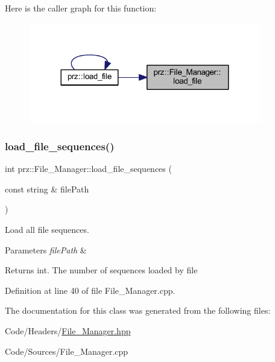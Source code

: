 Here is the caller graph for this function\+:
\nopagebreak
\begin{figure}[H]
\begin{center}
\leavevmode
\includegraphics[width=288pt]{classprz_1_1_file___manager_aad862a71b68f6bb1870b1750f33e70f4_icgraph}
\end{center}
\end{figure}
\mbox{\label{classprz_1_1_file___manager_a930093b7f609e4f9cf755efb0d91ef46}} 
\subsubsection{\texorpdfstring{load\_file\_sequences()}{load\_file\_sequences()}}
{\footnotesize\ttfamily int prz\+::\+File\+\_\+\+Manager\+::load\+\_\+file\+\_\+sequences (\begin{DoxyParamCaption}\item[{const string \&}]{file\+Path }\end{DoxyParamCaption})}



Load all file sequences. 


\begin{DoxyParams}{Parameters}
{\em file\+Path} & \\
\hline
\end{DoxyParams}
\begin{DoxyReturn}{Returns}
int. The number of sequences loaded by file 
\end{DoxyReturn}


Definition at line 40 of file File\+\_\+\+Manager.\+cpp.



The documentation for this class was generated from the following files\+:\begin{DoxyCompactItemize}
\item 
Code/\+Headers/\mbox{\hyperlink{_file___manager_8hpp}{File\+\_\+\+Manager.\+hpp}}\item 
Code/\+Sources/File\+\_\+\+Manager.\+cpp\end{DoxyCompactItemize}

